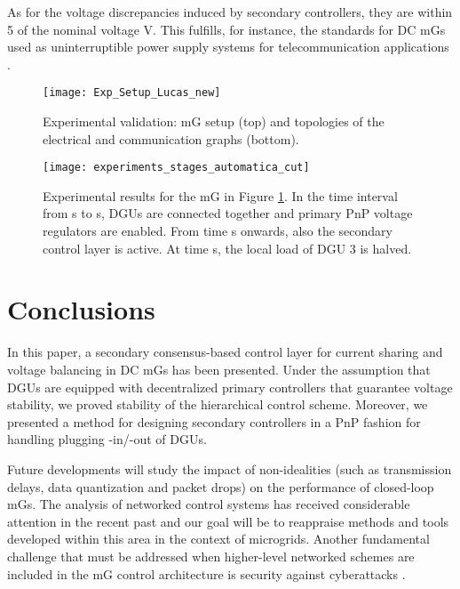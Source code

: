 \documentclass[a4paper]{article}
\theoremstyle{plain}
\begin{document}
As for the voltage discrepancies induced by secondary controllers, they are within 5 of the nominal voltage  V. This fulfills, for instance, the standards for DC mGs used as uninterruptible power supply systems for telecommunication applications \cite{schulz2007etsi}.

\begin{figure}
	\centering
	\texttt{[image: Exp\_Setup\_Lucas\_new]}
	\caption{Experimental validation: mG setup (top) and topologies of the electrical and communication graphs (bottom).}
	\label{fig:experimental_setup}
\end{figure}
\begin{figure}
	\centering
	\hspace{-4mm}
	\texttt{[image: experiments\_stages\_automatica\_cut]}
	\caption{Experimental results for the mG in Figure \ref{fig:experimental_setup}. In the time interval from  s to  s, DGUs are connected together and primary PnP voltage regulators are enabled. From time  s onwards, also the secondary control layer is active. At time  s, the local load of DGU 3 is halved.}
	\label{fig:experiments}
\end{figure}

\section{Conclusions}
In this paper, a secondary consensus-based control layer for
current sharing and voltage balancing in DC mGs has been
presented. Under the assumption that DGUs are equipped with decentralized primary controllers that guarantee voltage stability, we proved stability of the hierarchical control scheme. Moreover, we presented a method for designing secondary
controllers in a PnP fashion for handling plugging -in/-out of DGUs. 

Future developments will study the impact of non-idealities (such as transmission delays, data quantization and packet drops) on the performance of closed-loop mGs. The analysis of networked control systems has received considerable attention in the recent past \cite{Hespanha2007} and our goal will be to reappraise methods and tools developed within this area in the context of microgrids. Another fundamental challenge that must be addressed when higher-level networked schemes are included in the mG control architecture is security against cyberattacks \cite{Pasqualetti2013}.




     \clearpage
\end{document}
